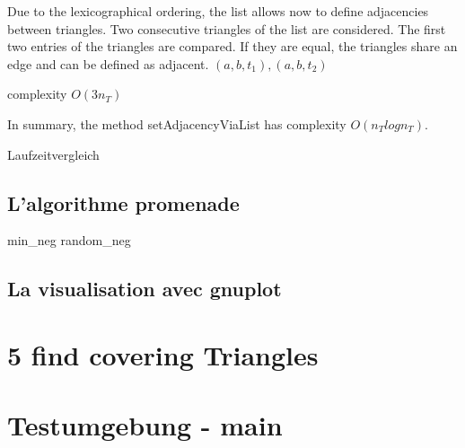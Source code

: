 \documentclass[10pt]{article}
\begin{document}
Due to the lexicographical ordering, the list allows now to define adjacencies between triangles. Two consecutive triangles of the list are considered. The first two entries of the triangles are compared. If they are equal, the triangles share an edge and can be defined as adjacent. $(a,b,t_1), (a,b,t_2)$

complexity $O(3n_T)$

In summary, the method setAdjacencyViaList has complexity $O(n_Tlogn_T)$.

Laufzeitvergleich

\subsection{L'algorithme promenade}

min_neg random_neg

\subsection{La visualisation avec gnuplot}

\section{5 find covering Triangles}

\section{Testumgebung - main}
\end{document}
